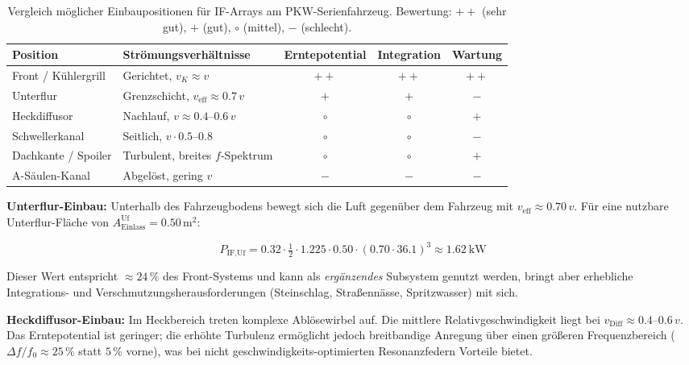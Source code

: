 ﻿\documentclass[12pt, a4paper]{report}
\theoremstyle{definition}
\theoremstyle{remark}
\newcommand{\Aeinlass}{A_{\text{Einlass}}}
\begin{document}
\begin{table}[H]
  \centering
  \caption{Vergleich möglicher Einbaupositionen für IF-Arrays am PKW-Serienfahrzeug.
           Bewertung: $++$ (sehr gut), $+$ (gut), $\circ$ (mittel), $-$ (schlecht).}
  \label{tab:einbaupositionen}
  \begin{tabular}{l>{\raggedright\arraybackslash}p{4.2cm}ccc}
    \toprule
    Position & Strömungsverhältnisse & Erntepotential & Integration & Wartung \\
    \midrule
    Front / Kühlergrill & Gerichtet, $v_K \approx v$ & $++$ & $++$ & $++$ \\
    Unterflur           & Grenzschicht, $v_{\text{eff}} \approx 0.7\,v$ & $+$  & $+$  & $-$  \\
    Heckdiffusor        & Nachlauf, $v \approx 0.4\text{--}0.6\,v$ & $\circ$ & $\circ$ & $+$ \\
    Schwellerkanal      & Seitlich, $v \cdot 0.5\text{--}0.8$ & $\circ$ & $\circ$ & $-$ \\
    Dachkante / Spoiler & Turbulent, breites $f$-Spektrum & $\circ$ & $\circ$ & $+$ \\
    A-Säulen-Kanal      & Abgelöst, gering $v$ & $-$  & $-$  & $-$ \\
    \bottomrule
  \end{tabular}
\end{table}

\textbf{Unterflur-Einbau:}
Unterhalb des Fahrzeugbodens bewegt sich die Luft gegenüber dem Fahrzeug
mit $v_{\text{eff}} \approx 0.70\,v$. Für eine nutzbare Unterflur-Fläche
von $\Aeinlass^{\text{Uf}} = 0.50\,\text{m}^2$:

\begin{equation}
  P_{\text{IF,Uf}} = 0.32 \cdot \tfrac{1}{2} \cdot 1.225 \cdot 0.50 \cdot (0.70 \cdot 36.1)^3
  \approx \SI{1.62}{\kilo\watt}
  \label{eq:p_unterflur}
\end{equation}

Dieser Wert entspricht $\approx 24\,\%$ des Front-Systems und kann als
\emph{ergänzendes} Subsystem genutzt werden, bringt aber erhebliche
Integrations- und Verschmutzungsherausforderungen (Steinschlag, Straßennässe,
Spritzwasser) mit sich.

\textbf{Heckdiffusor-Einbau:}
Im Heckbereich treten komplexe Ablösewirbel auf. Die mittlere
Relativgeschwindigkeit liegt bei $v_{\text{Diff}} \approx 0.4$--$0.6\,v$.
Das Erntepotential ist geringer; die erhöhte Turbulenz ermöglicht jedoch
breitbandige Anregung über einen größeren Frequenzbereich
($\Delta f / f_0 \approx 25\,\%$ statt $5\,\%$ vorne), was bei nicht
geschwindigkeits-optimierten Resonanzfedern Vorteile bietet.
\end{document}
